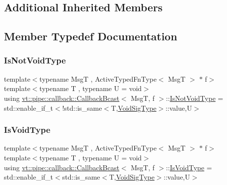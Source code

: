 \subsection*{Additional Inherited Members}


\subsection{Member Typedef Documentation}
\mbox{\label{structvt_1_1pipe_1_1callback_1_1_callback_bcast_a3f5efa2edf7f4c47fe047e086e63a477}} 
\subsubsection{\texorpdfstring{Is\+Not\+Void\+Type}{IsNotVoidType}}
{\footnotesize\ttfamily template$<$typename MsgT , Active\+Typed\+Fn\+Type$<$ Msg\+T $>$ $\ast$ f$>$ \\
template$<$typename T , typename U  = void$>$ \\
using \hyperlink{structvt_1_1pipe_1_1callback_1_1_callback_bcast}{vt\+::pipe\+::callback\+::\+Callback\+Bcast}$<$ MsgT, f $>$\+::\hyperlink{structvt_1_1pipe_1_1callback_1_1_callback_bcast_a3f5efa2edf7f4c47fe047e086e63a477}{Is\+Not\+Void\+Type} =  std\+::enable\+\_\+if\+\_\+t$<$!std\+::is\+\_\+same$<$T,\hyperlink{structvt_1_1pipe_1_1callback_1_1_callback_bcast_a64032b57b71c27653b93b3e13bf38145}{Void\+Sig\+Type}$>$\+::value,U$>$}

\mbox{\label{structvt_1_1pipe_1_1callback_1_1_callback_bcast_a3ca08c23824cfac76b837311a1d2c929}} 
\subsubsection{\texorpdfstring{Is\+Void\+Type}{IsVoidType}}
{\footnotesize\ttfamily template$<$typename MsgT , Active\+Typed\+Fn\+Type$<$ Msg\+T $>$ $\ast$ f$>$ \\
template$<$typename T , typename U  = void$>$ \\
using \hyperlink{structvt_1_1pipe_1_1callback_1_1_callback_bcast}{vt\+::pipe\+::callback\+::\+Callback\+Bcast}$<$ MsgT, f $>$\+::\hyperlink{structvt_1_1pipe_1_1callback_1_1_callback_bcast_a3ca08c23824cfac76b837311a1d2c929}{Is\+Void\+Type} =  std\+::enable\+\_\+if\+\_\+t$<$std\+::is\+\_\+same$<$T,\hyperlink{structvt_1_1pipe_1_1callback_1_1_callback_bcast_a64032b57b71c27653b93b3e13bf38145}{Void\+Sig\+Type}$>$\+::value,U$>$}

